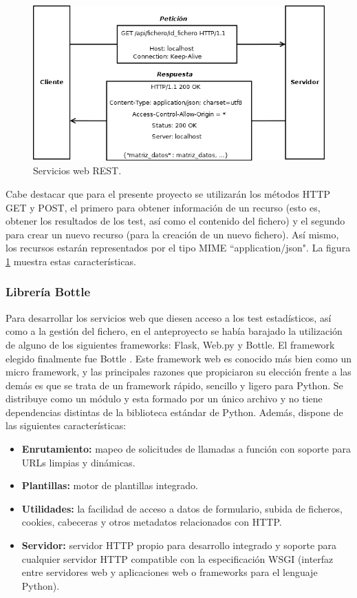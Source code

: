 \begin{figure}[H]
\centering
\includegraphics[width=12cm,height=6cm]{figuras/rest.png}
\caption{Servicios web REST.}
\label{fig:rest}
\end{figure}

Cabe destacar que para el presente proyecto se utilizarán los métodos HTTP GET y POST, el primero para obtener información de un recurso (esto es, obtener los resultados de los test, así como el contenido del fichero) y el segundo para crear un nuevo recurso (para la creación de un nuevo fichero). Así mismo, los recursos estarán representados por el tipo MIME ``application/json". La figura \ref{fig:rest} muestra estas características.

\subsubsection{\textbf{Librería Bottle}}
Para desarrollar los servicios web que diesen acceso a los test estadísticos, así como a la gestión del fichero, en el anteproyecto se había barajado la utilización de alguno de los siguientes frameworks: Flask, Web.py y Bottle. El framework elegido finalmente fue Bottle \cite{bottle}. Este framework web es conocido más bien como un micro framework, y las principales razones que propiciaron su elección frente a las demás es que se trata de un framework rápido, sencillo y ligero para Python. Se distribuye como un módulo y esta formado por un único archivo y no tiene dependencias distintas de la biblioteca estándar de Python. Además, dispone de las siguientes características:
\begin{itemize}
\item \textbf{Enrutamiento:} mapeo de solicitudes de llamadas a función con soporte para URLs limpias y dinámicas.
\item \textbf{Plantillas:} motor de plantillas integrado.
\item \textbf{Utilidades:} la facilidad de acceso a datos de formulario, subida de ficheros, cookies, cabeceras y otros metadatos relacionados con HTTP.
\item \textbf{Servidor:} servidor HTTP propio para desarrollo integrado y soporte para cualquier servidor HTTP compatible con la especificación WSGI (interfaz entre servidores web y aplicaciones web o frameworks para el lenguaje Python).
\end{itemize}

